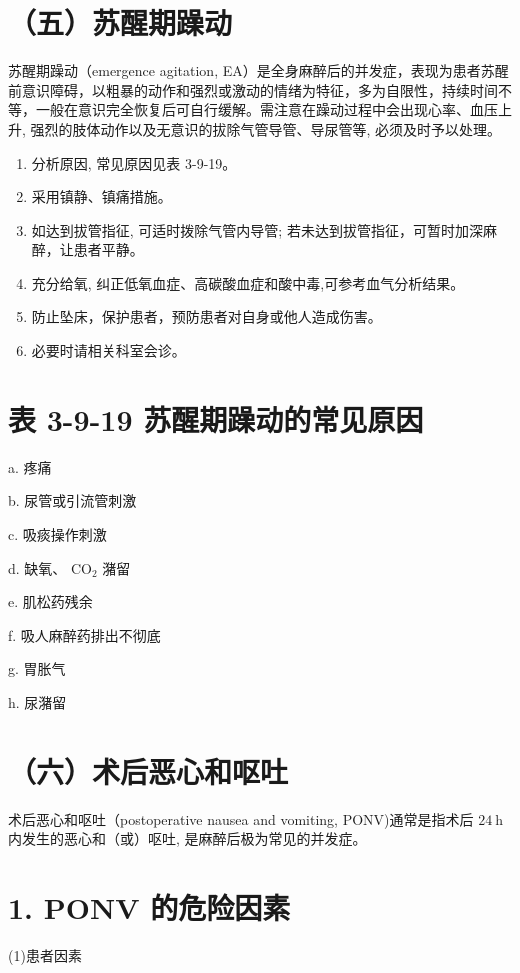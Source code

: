 \documentclass[10pt]{article}
\begin{document}
\section*{（五）苏醒期躁动}
苏醒期躁动（emergence agitation, EA）是全身麻醉后的并发症，表现为患者苏醒前意识障碍，以粗暴的动作和强烈或激动的情绪为特征，多为自限性，持续时间不等，一般在意识完全恢复后可自行缓解。需注意在躁动过程中会出现心率、血压上升, 强烈的肢体动作以及无意识的拔除气管导管、导尿管等, 必须及时予以处理。

\begin{enumerate}
  \item 分析原因, 常见原因见表 3-9-19。

  \item 采用镇静、镇痛措施。

  \item 如达到拔管指征, 可适时拨除气管内导管; 若未达到拔管指征，可暂时加深麻醉，让患者平静。

  \item 充分给氧, 纠正低氧血症、高碳酸血症和酸中毒,可参考血气分析结果。

  \item 防止坠床，保护患者，预防患者对自身或他人造成伤害。

  \item 必要时请相关科室会诊。

\end{enumerate}

\section*{表 3-9-19 苏醒期躁动的常见原因}
a. 疼痛

b. 尿管或引流管刺激

c. 吸痰操作刺激

d. 缺氧、 $\mathrm{CO}_{2}$ 潴留

e. 肌松药残余

f. 吸人麻醉药排出不彻底

g. 胃胀气

h. 尿潴留

\section*{（六）术后恶心和呕吐}
术后恶心和呕吐（postoperative nausea and vomiting, PONV)通常是指术后 $24 \mathrm{~h}$ 内发生的恶心和（或）呕吐, 是麻醉后极为常见的并发症。

\section*{1. PONV 的危险因素}
(1)患者因素
\end{document}
